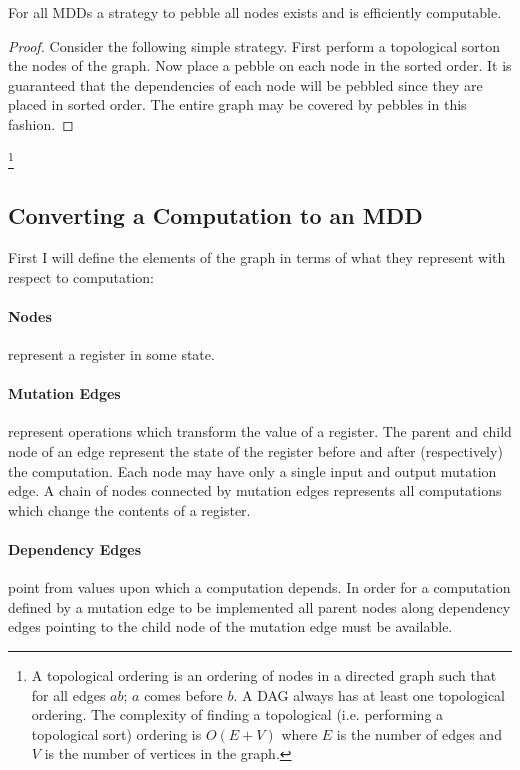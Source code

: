 \begin{theorem} For all MDDs a strategy to pebble all nodes exists and is
efficiently computable. \end{theorem}

\begin{proof} Consider the following simple strategy. First perform a
    topological sort\footnotemark on the nodes of the graph. Now place a pebble
    on each node in the sorted order. It is guaranteed that the dependencies of
    each node will be pebbled since they are placed in sorted order. The entire
    graph may be covered by pebbles in this fashion.\end{proof}
\footnote{A topological ordering is an ordering of nodes in a directed graph
    such that for all edges $ab$; $a$ comes before $b$. A DAG always has at
    least one topological ordering. The complexity of finding a topological
    (i.e. performing a topological sort) ordering is $O(E+V)$ where $E$ is the
    number of edges and $V$ is the number of vertices in the graph.}

\subsection{Converting a Computation to an MDD}

First I will define the elements of the graph in terms of what they represent
with respect to computation:

\paragraph{Nodes} represent a register in some state.

\paragraph{Mutation Edges} represent operations which transform the value
of a register. The parent and child node of an edge represent the state of the
register before and after (respectively) the computation. Each node may have
only a single input and output mutation edge. A chain of nodes connected by
mutation edges represents all computations which change the contents of a
register.

\paragraph{Dependency Edges} point from values upon which a computation
depends. In order for a computation defined by a mutation edge to be implemented
all parent nodes along dependency edges pointing to the child node of the
mutation edge must be available.

